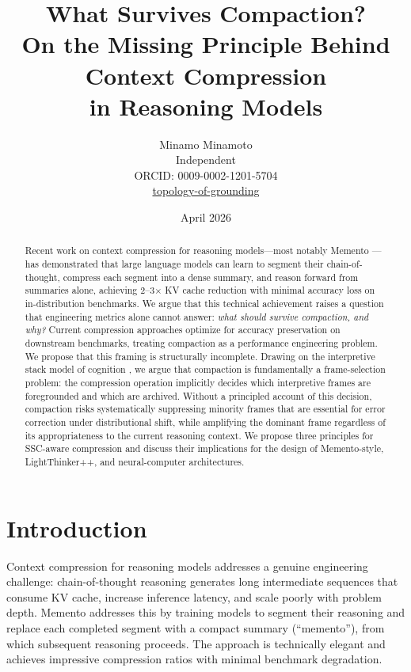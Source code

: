 \documentclass[12pt]{article}
\title{What Survives Compaction?\\
On the Missing Principle Behind Context Compression\\
in Reasoning Models}
\author{Minamo Minamoto\\
\small Independent\\
\small ORCID: 0009-0002-1201-5704\\
\small \href{https://github.com/minamominamoto/topology-of-grounding}{topology-of-grounding}
}
\date{April 2026}
\begin{document}
\maketitle

\begin{abstract}
Recent work on context compression for reasoning models---most notably
Memento \citep{kontonis2026memento}---has demonstrated that large language
models can learn to segment their chain-of-thought, compress each segment
into a dense summary, and reason forward from summaries alone, achieving
2--3$\times$ KV cache reduction with minimal accuracy loss on in-distribution
benchmarks. We argue that this technical achievement raises a question that
engineering metrics alone cannot answer: \emph{what should survive
compaction, and why?} Current compression approaches optimize for accuracy
preservation on downstream benchmarks, treating compaction as a performance
engineering problem. We propose that this framing is structurally incomplete.
Drawing on the interpretive stack model of cognition
\citep{minamoto2026accumulation}, we argue that compaction is
fundamentally a frame-selection problem: the compression operation implicitly
decides which interpretive frames are foregrounded and which are archived.
Without a principled account of this decision, compaction risks
systematically suppressing minority frames that are essential for error
correction under distributional shift, while amplifying the dominant frame
regardless of its appropriateness to the current reasoning context.
We propose three principles for SSC-aware compression and discuss their
implications for the design of Memento-style, LightThinker++, and
neural-computer architectures.
\end{abstract}

\section{Introduction}

Context compression for reasoning models addresses a genuine engineering
challenge: chain-of-thought reasoning generates long intermediate sequences
that consume KV cache, increase inference latency, and scale poorly with
problem depth. Memento \citep{kontonis2026memento} addresses this by training
models to segment their reasoning and replace each completed segment with a
compact summary (``memento''), from which subsequent reasoning proceeds.
The approach is technically elegant and achieves impressive compression
ratios with minimal benchmark degradation.
\end{document}
